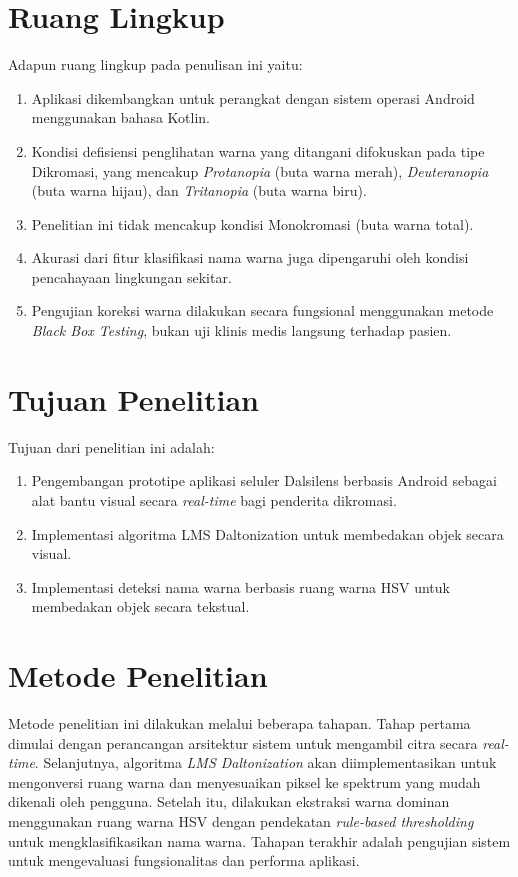 \section{Ruang Lingkup}

\setlength{\parindent}{2em} Adapun ruang lingkup pada penulisan ini yaitu:
\begin{enumerate}
  \item Aplikasi dikembangkan untuk perangkat dengan sistem operasi Android menggunakan bahasa Kotlin.
  \item Kondisi defisiensi penglihatan warna yang ditangani difokuskan pada tipe Dikromasi, yang mencakup \textit{Protanopia} (buta warna merah), \textit{Deuteranopia} (buta warna hijau), dan \textit{Tritanopia} (buta warna biru).
  \item Penelitian ini tidak mencakup kondisi Monokromasi (buta warna total).
  \item Akurasi dari fitur klasifikasi nama warna juga dipengaruhi oleh kondisi pencahayaan lingkungan sekitar.
  \item Pengujian koreksi warna dilakukan secara fungsional menggunakan metode \textit{Black Box Testing}, bukan uji klinis medis langsung terhadap pasien.
\end{enumerate}


\section{Tujuan Penelitian}
Tujuan dari penelitian ini adalah:
\begin{enumerate}
  \item Pengembangan prototipe aplikasi seluler Dalsilens berbasis Android sebagai alat bantu visual secara \textit{real-time} bagi penderita dikromasi.
  \item Implementasi algoritma LMS Daltonization untuk membedakan objek secara visual.
  \item Implementasi deteksi nama warna berbasis ruang warna HSV untuk membedakan objek secara tekstual.
\end{enumerate}

\section{Metode Penelitian}
\setlength{\parindent}{2em} Metode penelitian ini dilakukan melalui beberapa tahapan.
Tahap pertama dimulai dengan perancangan arsitektur sistem untuk mengambil citra secara \textit{real-time}.
Selanjutnya, algoritma \textit{LMS Daltonization} akan diimplementasikan untuk mengonversi ruang warna dan menyesuaikan piksel ke spektrum yang mudah dikenali oleh pengguna.
Setelah itu, dilakukan ekstraksi warna dominan menggunakan ruang warna HSV dengan pendekatan \textit{rule-based thresholding} untuk mengklasifikasikan nama warna.
Tahapan terakhir adalah pengujian sistem untuk mengevaluasi fungsionalitas dan performa aplikasi.

